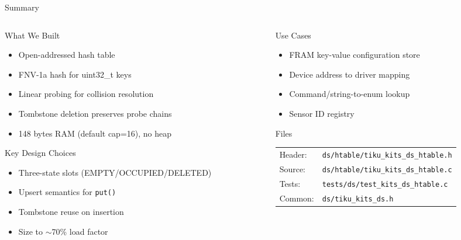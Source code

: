 \documentclass[aspectratio=169, 10pt]{beamer}
\begin{document}
\begin{frame}{Summary}
\begin{columns}[T]
\begin{column}{0.48\textwidth}
\begin{block}{What We Built}
\begin{itemize}
  \item Open-addressed hash table
  \item FNV-1a hash for uint32\_t keys
  \item Linear probing for collision resolution
  \item Tombstone deletion preserves probe chains
  \item 148 bytes RAM (default cap=16), no heap
\end{itemize}
\end{block}

\begin{block}{Key Design Choices}
\begin{itemize}
  \item Three-state slots (EMPTY/OCCUPIED/DELETED)
  \item Upsert semantics for \texttt{put()}
  \item Tombstone reuse on insertion
  \item Size to $\sim$70\% load factor
\end{itemize}
\end{block}
\end{column}

\begin{column}{0.48\textwidth}
\begin{block}{Use Cases}
\begin{itemize}
  \item FRAM key-value configuration store
  \item Device address to driver mapping
  \item Command/string-to-enum lookup
  \item Sensor ID registry
\end{itemize}
\end{block}

\begin{block}{Files}
\scriptsize
\begin{tabular}{@{}lp{4.5cm}@{}}
Header: & \texttt{ds/htable/tiku\_kits\_ds\_htable.h} \\
Source: & \texttt{ds/htable/tiku\_kits\_ds\_htable.c} \\
Tests: & \texttt{tests/ds/test\_kits\_ds\_htable.c} \\
Common: & \texttt{ds/tiku\_kits\_ds.h} \\
\end{tabular}
\end{block}
\end{column}
\end{columns}
\end{frame}
\end{document}
